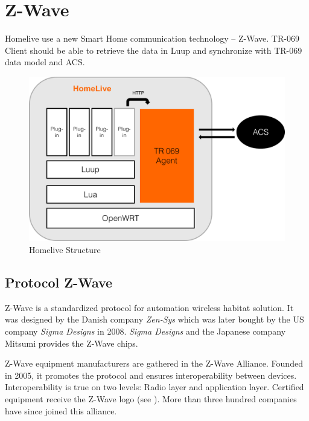 
\chapter{Z-Wave} %

\label{Chapter6} %

Homelive use a new Smart Home communication technology -- Z-Wave. TR-069 Client should be able to retrieve the data in Luup and synchronize with TR-069 data model and ACS.

\begin{figure}[htbp]
	\centering
		\includegraphics[width=12cm]{Figures/homelivestructure.png}
	\caption[Homelive Structure]{Homelive Structure}
	\label{fig:homelive}
\end{figure}

\section{Protocol Z-Wave}
Z-Wave is a standardized protocol for automation wireless habitat solution. It was designed by the Danish company \textit{Zen-Sys} which was later bought by the US company \textit{Sigma Designs} in 2008. \textit{Sigma Designs} and the Japanese company Mitsumi provides the Z-Wave chips.

Z-Wave equipment manufacturers are gathered in the Z-Wave Alliance. Founded in 2005, it promotes the protocol and ensures interoperability between devices. Interoperability is true on two levels: Radio layer and application layer. Certified equipment receive the Z-Wave logo (see ). More than three hundred companies have since joined this alliance.

